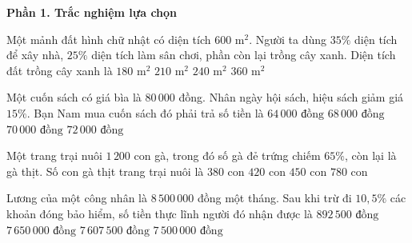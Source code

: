 \textbf{Phần 1. Trắc nghiệm lựa chọn}

\begin{ex} %
Một mảnh đất hình chữ nhật có diện tích $600\text{ m}^2$. Người ta dùng $35\%$ diện tích để xây nhà, $25\%$ diện tích làm sân chơi, phần còn lại trồng cây xanh. Diện tích đất trồng cây xanh là
\choice
{$180\text{ m}^2$}
{$210\text{ m}^2$}
{\True $240\text{ m}^2$}
{$360\text{ m}^2$}
\end{ex}

\begin{ex} %
Một cuốn sách có giá bìa là $80\,000$ đồng. Nhân ngày hội sách, hiệu sách giảm giá $15\%$. Bạn Nam mua cuốn sách đó phải trả số tiền là
\choice
{$64\,000\text{ đồng}$}
{\True $68\,000\text{ đồng}$}
{$70\,000\text{ đồng}$}
{$72\,000\text{ đồng}$}
\end{ex}

\begin{ex} %
Một trang trại nuôi $1\,200$ con gà, trong đó số gà đẻ trứng chiếm $65\%$, còn lại là gà thịt. Số con gà thịt trang trại nuôi là
\choice
{$380\text{ con}$}
{\True $420\text{ con}$}
{$450\text{ con}$}
{$780\text{ con}$}
\end{ex}

\begin{ex} %
Lương của một công nhân là $8\,500\,000$ đồng một tháng. Sau khi trừ đi $10{,}5\%$ các khoản đóng bảo hiểm, số tiền thực lĩnh người đó nhận được là
\choice
{$892\,500\text{ đồng}$}
{$7\,650\,000\text{ đồng}$}
{\True $7\,607\,500\text{ đồng}$}
{$7\,500\,000\text{ đồng}$}
\end{ex}

